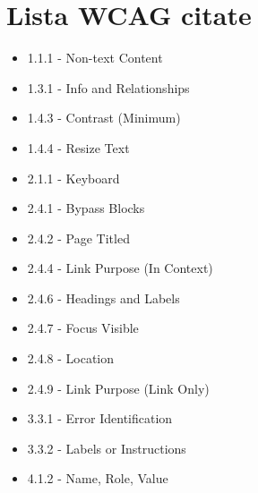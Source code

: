 \section{Lista WCAG citate}
\begin{itemize}
    \item \label{wcag:1.1.1} 1.1.1 - Non-text Content
    \item \label{wcag:1.3.1} 1.3.1 - Info and Relationships
    \item \label{wcag:1.4.3} 1.4.3 - Contrast (Minimum)
    \item \label{wcag:1.4.4} 1.4.4 - Resize Text
    \item \label{wcag:2.1.1} 2.1.1 - Keyboard
    \item \label{wcag:2.4.1} 2.4.1 - Bypass Blocks
    \item \label{wcag:2.4.2} 2.4.2 - Page Titled
    \item \label{wcag:2.4.4} 2.4.4 - Link Purpose (In Context)
    \item \label{wcag:2.4.6} 2.4.6 - Headings and Labels
    \item \label{wcag:2.4.7} 2.4.7 - Focus Visible
    \item \label{wcag:2.4.8} 2.4.8 - Location
    \item \label{wcag:2.4.9} 2.4.9 - Link Purpose (Link Only)
    \item \label{wcag:3.3.1} 3.3.1 - Error Identification
    \item \label{wcag:3.3.2} 3.3.2 - Labels or Instructions
    \item \label{wcag:4.1.2} 4.1.2 - Name, Role, Value
\end{itemize}



